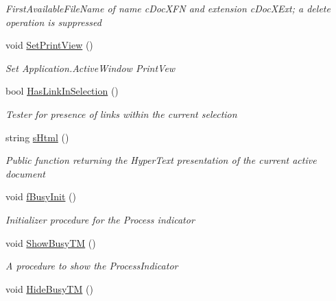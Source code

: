 \begin{DoxyCompactItemize}
\begin{DoxyCompactList}\small\item\em First\+Available\+File\+Name of name c\+Doc\+X\+F\+N and extension c\+Doc\+X\+Ext; a delete operation is suppressed \end{DoxyCompactList}\item 
void \hyperlink{class_e_u_cases_1_1_e_u_links_checker_word_add_in_1_1_e_u_links_checker_add_in_a42164aeb263d2c8ce0fa5f38a2bceba5}{Set\+Print\+View} ()
\begin{DoxyCompactList}\small\item\em Set Application.\+Active\+Window Print\+Vew \end{DoxyCompactList}\item 
bool \hyperlink{class_e_u_cases_1_1_e_u_links_checker_word_add_in_1_1_e_u_links_checker_add_in_ad08e09044d8ab8c053608b00cac7c5bd}{Has\+Link\+In\+Selection} ()
\begin{DoxyCompactList}\small\item\em Tester for presence of links within the current selection \end{DoxyCompactList}\item 
string \hyperlink{class_e_u_cases_1_1_e_u_links_checker_word_add_in_1_1_e_u_links_checker_add_in_a0187d1e5dd53126638702feccf102e64}{s\+Html} ()
\begin{DoxyCompactList}\small\item\em Public function returning the Hyper\+Text presentation of the current active document \end{DoxyCompactList}\item 
void \hyperlink{class_e_u_cases_1_1_e_u_links_checker_word_add_in_1_1_e_u_links_checker_add_in_a98f638eaf0a543967f1bf9acbe25e7b2}{f\+Busy\+Init} ()
\begin{DoxyCompactList}\small\item\em Initializer procedure for the Process indicator \end{DoxyCompactList}\item 
void \hyperlink{class_e_u_cases_1_1_e_u_links_checker_word_add_in_1_1_e_u_links_checker_add_in_aa04e13923948f282becd6eef73a0d95f}{Show\+Busy\+T\+M} ()
\begin{DoxyCompactList}\small\item\em A procedure to show the Process\+Indicator \end{DoxyCompactList}\item 
void \hyperlink{class_e_u_cases_1_1_e_u_links_checker_word_add_in_1_1_e_u_links_checker_add_in_a40c6743e24a760c30c09b048c829858a}{Hide\+Busy\+T\+M} ()

\end{DoxyCompactItemize}
